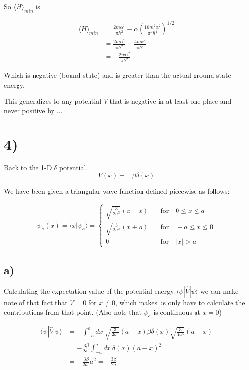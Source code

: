 \documentclass{article}
\newcommand{\p}[1]{\left(#1\right)}
\newcommand{\braket}[1]{\langle#1\rangle}
\begin{document}
So $\braket{H}_{min}$ is

\begin{align*}
    \braket{H}_{min}&=\frac{2m\alpha^2}{\pi\hbar^2}-\alpha\p{\frac{16m^2\alpha^2}{\pi^2\hbar^4}}^{1/2}\\[1em]
    &=\frac{2m\alpha^2}{\pi\hbar^2}-\frac{4m\alpha^2}{\pi\hbar^2}\\[1em]
    &=-\frac{2m\alpha^2}{\pi\hbar^2}
\end{align*}

Which is negative (bound state) and is greater than the actual ground state energy.

This generalizes to any potential $V$ that is negative in at least one place and never positive by ...

\section*{4)}
Back to the 1-D $\delta$ potential. $$V(x)=-\beta\delta\p{x}$$

We have been given a triangular wave function defined piecewise as follows:

\begin{align*}
   \psi_a(x)=\langle{x}|\psi_a\rangle=\begin{cases}
       \sqrt{\frac{3}{2a^3}}\p{a-x}\quad &\text{for}\quad 0\leq{x}\leq{a}\\[1em]
   \sqrt{\frac{3}{2a^3}}\p{x+a}\quad&\text{for}\quad -a\leq{x}\leq{0}\\[1em]
   0\quad &\text{for}\quad |x|>{a}
   \end{cases}
\end{align*}

\subsection*{a)}
Calculating the expectation value of the potential energy $\langle\psi|\hat{V}|\psi\rangle$ we can make note of that fact that $V=0$ for $x\neq0$, which makes us only have to calculate the contributions from that point. (Also note that $\psi_a$ is continuous at $x=0$)

\begin{align*}
    \langle\psi|\hat{V}|\psi\rangle&=-\int_{-a}^adx\:\sqrt{\frac{3}{2a^3}}(a-x)\beta\delta(x)\sqrt{\frac{3}{2a^3}}(a-x) \\[1em]
    &=-\frac{3\beta}{2a^3}\int_{-a}^{a}dx\:\delta(x)(a-x)^2\\[1em]
    &=-\frac{3\beta}{2a^3}a^2=-\frac{3\beta}{2a}
\end{align*}
\end{document}
